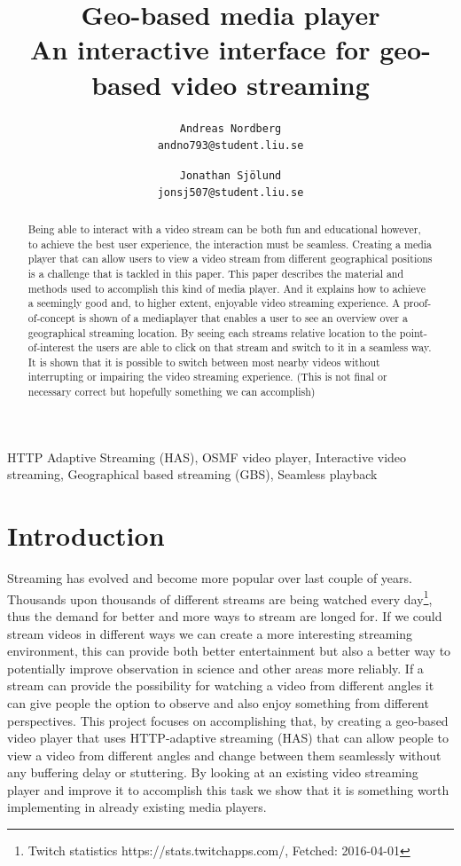 \documentclass[9pt,a4paper]{acmproc}
\author{
\texttt{Andreas Nordberg}\\
\texttt{andno793@student.liu.se}
  \and
  \texttt{Jonathan Sjölund}\\
  \texttt{jonsj507@student.liu.se}
}
\begin{document}
\title{%
	Geo-based media player \\
	\large An interactive interface for geo-based video streaming}
\maketitle

\cleardoublepage
{}
\setcounter{page}{3}

\begin{abstract}
Being able to interact with a video stream can be both fun and educational however, to achieve the best user experience, the interaction must be seamless. Creating a media player that can allow users to view a video stream from different geographical positions is a challenge that is tackled in this paper. This paper describes the material and methods used to accomplish this kind of media player. And it explains how to achieve a seemingly good and, to higher extent, enjoyable video streaming experience. A proof-of-concept is shown of a mediaplayer that enables a user to see an overview over a geographical streaming location. By seeing each streams relative location to the point-of-interest the users are able to click on that stream and switch to it in a seamless way. It is shown that it is possible to switch between most nearby videos without interrupting or impairing the video streaming experience. (This is not final or necessary correct but hopefully something we can accomplish)

\end{abstract}

\begin{keywords}
HTTP Adaptive Streaming (HAS), OSMF video player, Interactive video streaming, Geographical based streaming (GBS), Seamless playback
\end{keywords}

\section{Introduction} 

Streaming has evolved and become more popular over last couple of years. Thousands upon thousands of different streams are being watched every day\footnote{Twitch statistics https://stats.twitchapps.com/, Fetched: 2016-04-01}, thus the demand for better and more ways to stream are longed for. If we could stream videos in different ways we can create a more interesting streaming environment, this can provide both better entertainment but also a better way to potentially improve observation in science and other areas more reliably. If a stream can provide the possibility for watching a video from different angles it can give people the option to observe and also enjoy something from different perspectives. This project focuses on accomplishing that, by creating a geo-based video player that uses HTTP-adaptive streaming (HAS) that can allow people to view a video from different angles and change between them seamlessly without any buffering delay or stuttering. By looking at an existing video streaming player and improve it to accomplish this task we show that it is something worth implementing in already existing media players.
\end{document}
